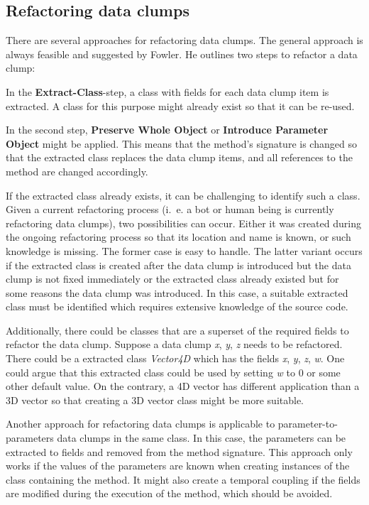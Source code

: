\subsection{Refactoring data clumps}\label{sec:data_clump_refactor}

There are several approaches for refactoring data clumps. The general approach is always feasible and suggested by Fowler.
He outlines two  steps to refactor a data clump:

In the  \textbf{Extract-Class}-step, a class with fields for each data clump item is extracted. A class for this purpose might already exist so that it can be re-used.

In the second step, \textbf{Preserve Whole Object} or \textbf{Introduce Parameter Object} might be applied. This means that the method's signature is changed so that the extracted class replaces the data clump items, and all references to the method are changed accordingly.

If the extracted class already exists, it can be challenging to identify such a class. Given a current refactoring process (i.~e. a bot or human being is currently refactoring data clumps), two possibilities can occur. Either it was created during the ongoing refactoring process so that its location and name is known, or such knowledge is missing. The former case is easy to handle.  The latter variant occurs if the extracted class is created after the data clump is introduced but the data clump is not fixed immediately or the extracted class already existed but for some reasons the data clump was introduced. In this case, a suitable extracted class must be identified which requires extensive knowledge of the source code.

Additionally, there could be classes that are a superset of the required fields to refactor the data clump. Suppose a data clump \textit{x}, \textit{y}, \textit{z} needs to be refactored. There could be a extracted class \textit{Vector4D} which has the fields  \textit{x}, \textit{y}, \textit{z}, \textit{w}. One could argue that this extracted class could be used by setting \textit{w} to 0 or some other default value. On the contrary, a 4D vector has different application than a 3D vector so that creating a 3D vector class might be more suitable. 

Another approach for refactoring data clumps is applicable to parameter-to-parameters data clumps in the same class. In this case, the parameters can be extracted to fields and removed from the method signature. This approach only works if the values of the parameters are known when creating instances of the class containing the method. It might also create a temporal  coupling if the fields are modified during the execution of the method, which should be avoided. 


